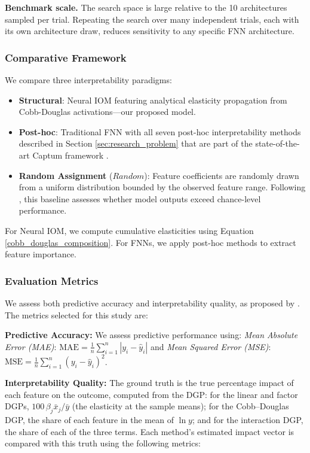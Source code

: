 \documentclass[preprint,12pt,authoryear]{sn-jnl}
\begin{document}
\medskip
\noindent\textbf{Benchmark scale.} The search space is large relative to the 10 architectures sampled per trial. Repeating the search over many independent trials, each with its own architecture draw, reduces sensitivity to any specific FNN architecture.

\subsubsection{Comparative Framework}
We compare three interpretability paradigms:
\begin{itemize} [leftmargin=*, itemsep=0pt, topsep=2pt, parsep=0pt]
    \item \textbf{Structural}: Neural IOM featuring analytical elasticity propagation from Cobb-Douglas activations—our proposed model.
    \item \textbf{Post-hoc}: Traditional FNN with all seven post-hoc interpretability methods described in Section \ref{sec:research_problem} that are part of the state-of-the-art Captum framework \citep{kokhlikyan2020captum}.
    \item \textbf{Random Assignment} ($Random$): Feature coefficients are randomly drawn from a uniform distribution bounded by the observed feature range. Following \cite{wilming2022scrutinizing}, this baseline assesses whether model outputs exceed chance-level performance.
\end{itemize}
For Neural IOM, we compute cumulative elasticities using Equation \ref{cobb_douglas_composition}. For FNNs, we apply post-hoc methods to extract feature importance.

\subsubsection{Evaluation Metrics}

We assess both predictive accuracy and interpretability quality, as proposed by \cite{wilming2022scrutinizing}. The metrics selected for this study are:

\textbf{Predictive Accuracy:} We assess predictive performance using: \textit{Mean Absolute Error (MAE)}: $\text{MAE} = \frac{1}{n} \sum_{i=1}^n |y_i - \hat{y}_i|$ and \textit{Mean Squared Error (MSE)}: $\text{MSE} = \frac{1}{n} \sum_{i=1}^n (y_i - \hat{y}_i)^2$.

\textbf{Interpretability Quality:}
The ground truth is the true percentage impact of each feature on the outcome, computed from the DGP: for the linear and factor DGPs, $100\,\beta_j\bar{x}_j/\bar{y}$ (the elasticity at the sample means); for the Cobb--Douglas DGP, the share of each feature in the mean of $\ln y$; and for the interaction DGP, the share of each of the three terms. Each method's estimated impact vector is compared with this truth using the following metrics:
\end{document}
